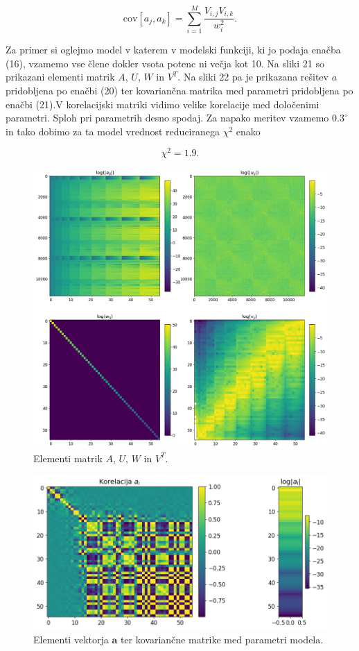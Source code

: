 \documentclass[slovene,11pt,a4paper]{article}
\begin{document}
\begin{equation}
\text{cov}[a_j, a_k] = \sum_{i=1}^M \frac{V_{i,j} V_{i,k}}{w_i^2}.
\end{equation}

Za primer si oglejmo model v katerem v modelski funkciji, ki jo podaja enačba (16), vzamemo vse člene dokler vsota potenc ni večja kot 10. Na sliki 21 so prikazani elementi matrik $A$, $U$, $W$ in $V^T$. Na sliki 22 pa je prikazana rešitev $a$ pridobljena po enačbi (20) ter kovariančna matrika med parametri pridobljena po enačbi (21).V korelacijski matriki vidimo velike korelacije med določenimi parametri. Sploh pri parametrih desno spodaj. Za napako meritev vzamemo $0.3^\circ$ in tako dobimo za ta model vrednost reduciranega $\chi^2$ enako

\[
\chi^2 = 1.9.
\]

\begin{figure}[h!]
\centering
\includegraphics[width=14cm]{spektro2.png}
\caption{Elementi matrik $A$, $U$, $W$ in $V^T$.}
\end{figure}

\begin{figure}[h!]
\centering
\includegraphics[width=14cm]{spektro3.png}
\caption{Elementi vektorja $\textbf{a}$ ter kovariančne matrike med parametri modela.}
\end{figure}
\end{document}

